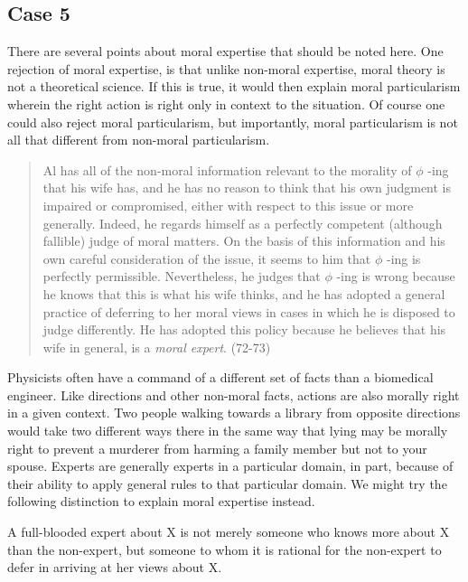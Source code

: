 \documentclass[
  12pt,
]{book}
\newenvironment{Shaded}{\begin{snugshade}}{\end{snugshade}}
\newcommand{\NormalTok}[1]{#1}
\theoremstyle{definition}
\theoremstyle{definition}
\theoremstyle{definition}
\theoremstyle{definition}
\theoremstyle{remark}
\begin{document}
\subsection*{Case 5}\label{case-5}

There are several points about moral expertise that should be noted here. One rejection of moral expertise, is that unlike non-moral expertise, moral theory is not a theoretical science. If this is true, it would then explain moral particularism wherein the right action is right only in context to the situation. Of course one could also reject moral particularism, but importantly, moral particularism is not all that different from non-moral particularism.

\begin{quote}
Al has all of the non-moral information relevant to the morality of \(\phi\) -ing that his wife has, and he has no reason to think that his own judgment is impaired or compromised, either with respect to this issue or more generally. Indeed, he regards himself as a perfectly competent (although fallible) judge of moral matters. On the basis of this information and his own careful consideration of the issue, it seems to him that \(\phi\) -ing is perfectly permissible. Nevertheless, he judges that \(\phi\) -ing is wrong because he knows that this is what his wife thinks, and he has adopted a general practice of deferring to her moral views in cases in which he is disposed to judge differently. He has adopted this policy because he believes that his wife in general, is a \emph{moral expert}. (72-73)
\end{quote}

Physicists often have a command of a different set of facts than a biomedical engineer. Like directions and other non-moral facts, actions are also morally right in a given context. Two people walking towards a library from opposite directions would take two different ways there in the same way that lying may be morally right to prevent a murderer from harming a family member but not to your spouse. Experts are generally experts in a particular domain, in part, because of their ability to apply general rules to that particular domain. We might try the following distinction to explain moral expertise instead.

\begin{Shaded}
\begin{Highlighting}[]

\NormalTok{A full{-}blooded expert about X is not merely someone who knows more about X than the non{-}expert, but someone to whom it is rational for the non{-}expert to defer in arriving at her views about X.}
\end{Highlighting}
\end{Shaded}
\end{document}

